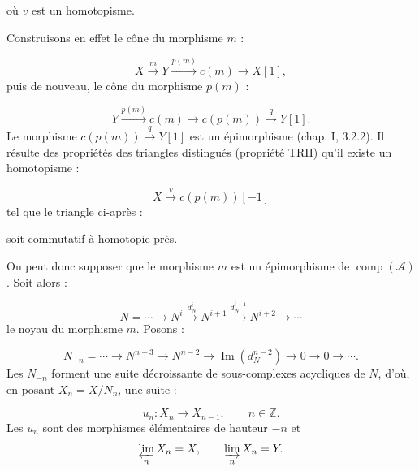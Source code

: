 \clearpage
{}%
\begingroup\small\setlength{\parskip}{0pt}\setlength{\emergencystretch}{1.5em}
\setlength{\abovedisplayskip}{4pt plus 2pt minus 2pt}%
\setlength{\belowdisplayskip}{4pt plus 2pt minus 2pt}%

où $v$ est un homotopisme.

Construisons en effet le cône du morphisme $m$ :

\[
X\xrightarrow{m}Y\xrightarrow{p(m)}c(m)
\longrightarrow X[1],
\]
puis de nouveau, le cône du morphisme $p(m)$ :

\[
Y\xrightarrow{p(m)}c(m)\longrightarrow c(p(m))
\xrightarrow{q}Y[1].
\]
Le morphisme $c(p(m))\xrightarrow{q}Y[1]$ est un épimorphisme
(chap. I, 3.2.2). Il résulte des propriétés des triangles distingués
(propriété TRII) qu'il existe un homotopisme :

\[
X\xrightarrow{v}c(p(m))[-1]
\]
tel que le triangle ci-après :

\begin{center}
\end{center}
soit commutatif à homotopie près.

On peut donc supposer que le morphisme $m$ est un épimorphisme de
$\operatorname{comp}(\mathcal A)$. Soit alors :

\[
N=\cdots\longrightarrow N^i\xrightarrow{d_N^i}N^{i+1}
\xrightarrow{d_N^{i+1}}N^{i+2}\longrightarrow\cdots
\]
le noyau du morphisme $m$. Posons :

\[
N_{-n}=\cdots\longrightarrow N^{n-3}\longrightarrow N^{n-2}
\longrightarrow\operatorname{Im}(d_N^{n-2})
\longrightarrow0\longrightarrow0\longrightarrow\cdots.
\]
Les $N_{-n}$ forment une suite décroissante de sous-complexes acycliques
de $N$, d'où, en posant $X_n=X/N_n$, une suite :

\[
u_n\colon X_n\longrightarrow X_{n-1},\qquad n\in\mathbb Z.
\]
Les $u_n$ sont des morphismes élémentaires de hauteur $-n$ et
\[
\varprojlim_n X_n=X,
\qquad
\varinjlim_n X_n=Y.
\]
\endgroup
